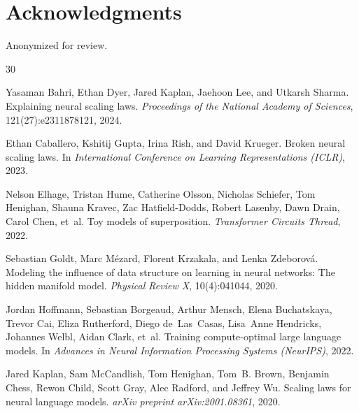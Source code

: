 \documentclass{article}
\begin{document}
\section*{Acknowledgments}
Anonymized for review.




\begin{thebibliography}{30}

Yasaman Bahri, Ethan Dyer, Jared Kaplan, Jaehoon Lee, and Utkarsh Sharma.
\newblock Explaining neural scaling laws.
\newblock \emph{Proceedings of the National Academy of Sciences}, 121(27):e2311878121, 2024.

Ethan Caballero, Kshitij Gupta, Irina Rish, and David Krueger.
\newblock Broken neural scaling laws.
\newblock In \emph{International Conference on Learning Representations (ICLR)}, 2023.

Nelson Elhage, Tristan Hume, Catherine Olsson, Nicholas Schiefer, Tom Henighan, Shauna Kravec, Zac Hatfield-Dodds, Robert Lasenby, Dawn Drain, Carol Chen, et~al.
\newblock Toy models of superposition.
\newblock \emph{Transformer Circuits Thread}, 2022.

Sebastian Goldt, Marc M{\'e}zard, Florent Krzakala, and Lenka Zdeborov{\'a}.
\newblock Modeling the influence of data structure on learning in neural networks: The hidden manifold model.
\newblock \emph{Physical Review X}, 10(4):041044, 2020.

Jordan Hoffmann, Sebastian Borgeaud, Arthur Mensch, Elena Buchatskaya, Trevor Cai, Eliza Rutherford, Diego de~Las~Casas, Lisa~Anne Hendricks, Johannes Welbl, Aidan Clark, et~al.
\newblock Training compute-optimal large language models.
\newblock In \emph{Advances in Neural Information Processing Systems (NeurIPS)}, 2022.

Jared Kaplan, Sam McCandlish, Tom Henighan, Tom~B. Brown, Benjamin Chess, Rewon Child, Scott Gray, Alec Radford, and Jeffrey Wu.
\newblock Scaling laws for neural language models.
\newblock \emph{arXiv preprint arXiv:2001.08361}, 2020.


\end{thebibliography}
\end{document}
